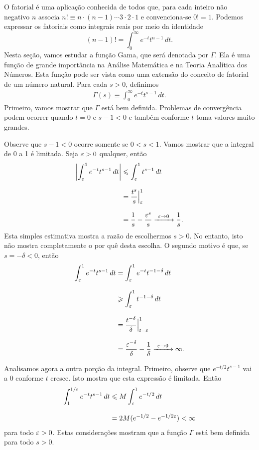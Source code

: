     O fatorial é uma aplicação conhecida de todos que, para cada inteiro não negativo $n$ 
    associa $n! \equiv n \cdot (n-1) \cdots 3 \cdot 2 \cdot 1$ e convenciona-se $0! = 1$. 
    Podemos expressar os fatoriais como integrais reais por meio da identidade
    \[ 
    (n-1)! = \int_0^{\infty}e^{-t} t^{n-1} \, dt.
    \]
    Nesta seção, vamos estudar a função Gama, que será denotada por $\Gamma$. Ela é uma função de grande importância na Análise 
    Matemática e na Teoria Analítica dos Números. 
    Esta função pode ser vista como uma extensão 
    do conceito de fatorial de um número natural. 
    Para cada $s>0$, definimos
    \begin{align}
        \label{def-func-gamma-real}
    \Gamma(s) \equiv \int_0^{\infty}e^{-t} t^{s-1} \, dt.
    \end{align}
    Primeiro, vamos mostrar que $\Gamma$ está bem definida. Problemas de convergência 
    podem ocorrer quando $t = 0$ e $s - 1 < 0$ e também conforme $t$ toma valores muito grandes.
    
    Observe que $s - 1 < 0$ ocorre somente se $0 < s < 1$. Vamos mostrar que a integral 
    de 0 a 1 é limitada. Seja $\varepsilon > 0$ qualquer, então
    \begin{align*}
        \left| \int_{\varepsilon}^{1}e^{-t}t^{s-1} \, dt \right| 
        &\leqslant \int_{\varepsilon}^{1}t^{s-1} \, dt \\[0.3cm]
        &= \frac{t^s}{s}\Big |_{\varepsilon}^{1} \\[0.3cm]
        &= \frac{1}{s} - \frac{\varepsilon^s}{s} \xrightarrow{\ \varepsilon\to 0\ } \frac{1}{s}.
    \end{align*}
    Esta simples estimativa mostra a razão de escolhermos $s > 0$. 
    No entanto, isto não mostra completamente o por quê desta escolha.
    O segundo motivo é que, se $s = -\delta < 0$, então
    \begin{align*}
        \int_{\varepsilon}^{1}e^{-t}t^{s-1} \, dt &= \int_{\varepsilon}^{1}e^{-t}t^{-1-\delta} \, dt \\[0.3cm]
        &\geqslant \int_{\varepsilon}^{1}t^{-1-\delta} \, dt \\[0.3cm]
        &= \frac{t^{-\delta}}{\delta}\Big |_{t = \varepsilon}^{1} \\[0.3cm]
        &= \frac{\varepsilon^{-\delta}}{\delta} - \frac{1}{\delta} \xrightarrow{\ \varepsilon\to 0\ } \infty.
    \end{align*}
    
   
    
    Analisamos agora a outra porção da integral. Primeiro, observe que $e^{-t/2}t^{s-1}$ 
    vai a 0 conforme $t$ cresce. Isto mostra que esta expressão é limitada. Então
    \begin{align*}
        \int_{1}^{1/\varepsilon}e^{-t}t^{s-1} \, dt &\leqslant M\int_{\varepsilon}^{1}e^{-t/2} \, dt \\[0.3cm]
        &= 2M(e^{-1/2} - e^{-1/2\varepsilon}) < \infty
    \end{align*}
    para todo $\varepsilon > 0$. 
    Estas considerações mostram que a função $\Gamma$ está bem 
    definida para todo $s > 0$.
    
